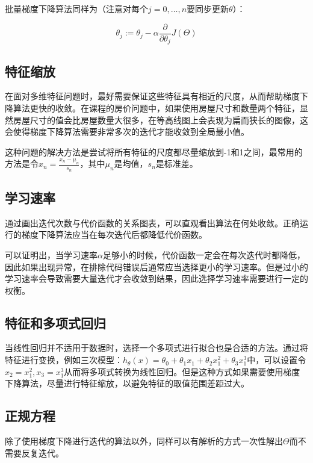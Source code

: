\documentclass[12pt, a4paper]{article}
\begin{document}
批量梯度下降算法同样为（注意对每个$j=0,\dots,n$要同步更新$\theta$）：

\begin{equation*}
    \theta_j:=\theta_j-\alpha\frac{\partial}{\partial\theta_j}J(\Theta)
\end{equation*}


\subsection{特征缩放}

在面对多维特征问题时，最好需要保证这些特征具有相近的尺度，从而帮助梯度下降算法更快的收敛。在课程的房价问题中，如果使用房屋尺寸和数量两个特征，显然房屋尺寸的值会比房屋数量大很多，在等高线图上会表现为扁而狭长的图像，这会使得梯度下降算法需要非常多次的迭代才能收敛到全局最小值。

这种问题的解决方法是尝试将所有特征的尺度都尽量缩放到-1和1之间，最常用的方法是令$x_n=\frac{x_n-\mu_n}{s_n}$，其中$\mu_n$是均值，$s_n$是标准差。

\subsection{学习速率}

通过画出迭代次数与代价函数的关系图表，可以直观看出算法在何处收敛。正确运行的梯度下降算法应当在每次迭代后都降低代价函数。

可以证明出，当学习速率$\alpha$足够小的时候，代价函数一定会在每次迭代时都降低，因此如果出现异常，在排除代码错误后通常应当选择更小的学习速率。但是过小的学习速率会导致需要大量迭代才会收敛到结果，因此选择学习速率需要进行一定的权衡。

\subsection{特征和多项式回归}

当线性回归并不适用于数据时，选择一个多项式进行拟合也是合适的方法。通过将特征进行变换，例如三次模型：$h_\theta(x)=\theta_0+\theta_1x_1+\theta_2x_1^2+\theta_3x_1^3$中，可以设置令$x_2=x_1^2,x_3=x_1^3$从而将多项式转换为线性回归。但是这种方式如果需要使用梯度下降算法，尽量进行特征缩放，以避免特征的取值范围差距过大。

\subsection{正规方程}

除了使用梯度下降进行迭代的算法以外，同样可以有解析的方式一次性解出$\Theta$而不需要反复迭代。
\end{document}
